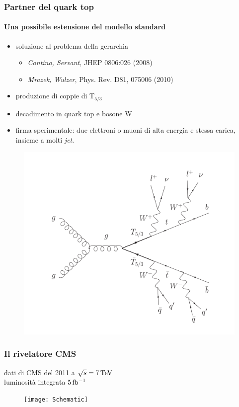\documentclass[italian]{beamer}
\begin{document}
\begin{frame}
    \frametitle{Partner del quark top}
    \framesubtitle{Una possibile estensione del modello standard}
    \begin{itemize}
        \item soluzione al problema della gerarchia
            \begin{itemize}
                \item \emph{Contino, Servant}, JHEP 0806:026 (2008)
                \item \emph{Mrazek, Wulzer}, Phys. Rev. D81, 075006 (2010)
            \end{itemize}
        \item produzione di coppie di $\mathrm{T}_{5/3}$
        \item decadimento in quark top e bosone $\mathrm{W}$
        \item \alert{firma sperimentale: due elettroni o muoni di alta energia e
                stessa carica, insieme a molti \emph{jet}.}
    \end{itemize}
    \begin{figure}[h]
        \centering
        \includegraphics[height=.5\textheight]{TTbar_feynman}
    \end{figure}
\end{frame}

\begin{frame}
    \frametitle{Il rivelatore CMS}
    dati di CMS del
            2011 a $\sqrt{s} = \unit[7]{TeV}$\\
            luminosit\`a integrata
            $\unit[5]{fb^{-1}}$                          
            \begin{figure}[h]
                \centering
                \texttt{[image: Schematic]}
            \end{figure}
\end{frame}
\end{document}
